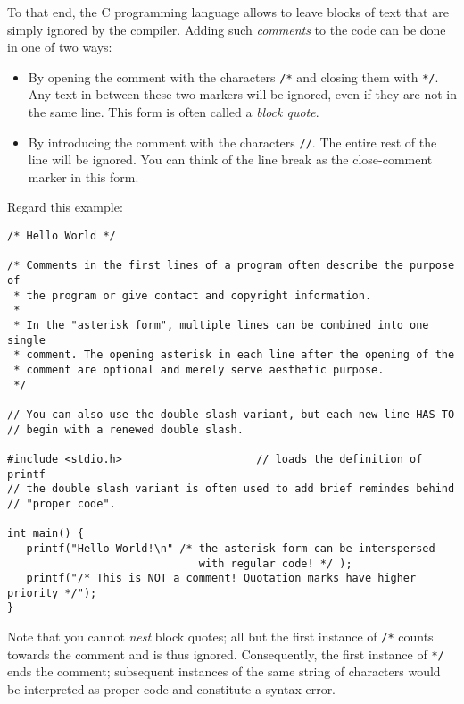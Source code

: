 To that end, the C programming language allows to leave blocks of text that are simply ignored by the compiler. Adding such \emph{comments} to the code can be done in one of two ways: \vspace{-9pt}
\begin{itemize}
\setlength\itemsep{0pt}
\item By opening the comment with the characters \texttt{/*} and closing them with \texttt{*/}. Any text in between these two markers will be ignored, even if they are not in the same line.
	This form is often called a \emph{block quote}.
\item By introducing the comment with the characters \texttt{//}. The entire rest of the line will be ignored. You can think of the line break as the close-comment marker in this form.
\end{itemize}

Regard this example:
\begin{codebox}[helloworld.c]
\begin{verbatim}
/* Hello World */

/* Comments in the first lines of a program often describe the purpose of
 * the program or give contact and copyright information.
 *
 * In the "asterisk form", multiple lines can be combined into one single 
 * comment. The opening asterisk in each line after the opening of the
 * comment are optional and merely serve aesthetic purpose.
 */

// You can also use the double-slash variant, but each new line HAS TO 
// begin with a renewed double slash.

#include <stdio.h>                     // loads the definition of printf
// the double slash variant is often used to add brief remindes behind
// "proper code".

int main() {
   printf("Hello World!\n" /* the asterisk form can be interspersed
                              with regular code! */ );
   printf("/* This is NOT a comment! Quotation marks have higher priority */");
}
\end{verbatim}
 \label{code:comments}
\end{codebox}

Note that you cannot \emph{nest} block quotes; all but the first instance of \texttt{/*} counts towards the comment and is thus ignored. Consequently, the first instance of \texttt{*/} ends the comment; subsequent instances of the same string of characters would be interpreted as proper code and constitute a syntax error.


